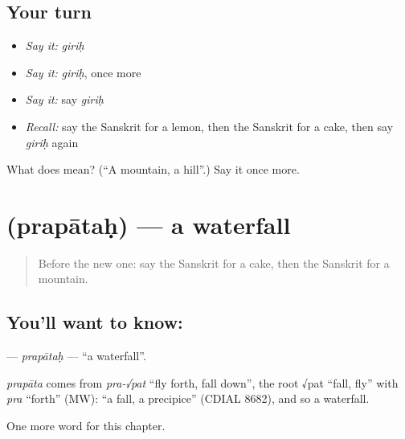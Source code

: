 \subsection*{Your turn}
\begin{itemize}
\raggedright
  \item \emph{Say it:} \emph{giriḥ}
  \item \emph{Say it:} \emph{giriḥ}, once more
  \item \emph{Say it:} say \emph{giriḥ}
  \item \emph{Recall:} say the Sanskrit for a lemon, then the Sanskrit for a cake, then say \emph{giriḥ} again
\end{itemize}

\begin{tcolorbox}[breakable,colback=teal!4,colframe=teal!35!black,title={Before you move on}]
What does  mean? (\textquotedblleft{}A mountain, a hill\textquotedblright{}.) Say it once more.
\end{tcolorbox}
\section[\texorpdfstring{\sk{प्रपातः} (prapātaḥ)}{प्रपातः (prapātaḥ)}]{ (prapātaḥ) — a waterfall}

\label{lesson:SA-C110-prapatah}



\begin{quote}
Before the new one: say the Sanskrit for a cake, then the Sanskrit for a mountain.
\end{quote}

\subsection*{You'll want to know: }
\textbf{} — \emph{prapātaḥ} — \textquotedblleft{}a waterfall\textquotedblright{}.

\begin{cousinweb}
\emph{prapāta} comes from \emph{pra-√pat} \textquotedblleft{}fly forth, fall down\textquotedblright{}, the root √pat \textquotedblleft{}fall, fly\textquotedblright{} with \emph{pra} \textquotedblleft{}forth\textquotedblright{} (MW): \textquotedblleft{}a fall, a precipice\textquotedblright{} (CDIAL 8682), and so a waterfall.
\end{cousinweb}

\begin{grammarlens}[title={What you've built}]
One more word for this chapter.
\end{grammarlens}

